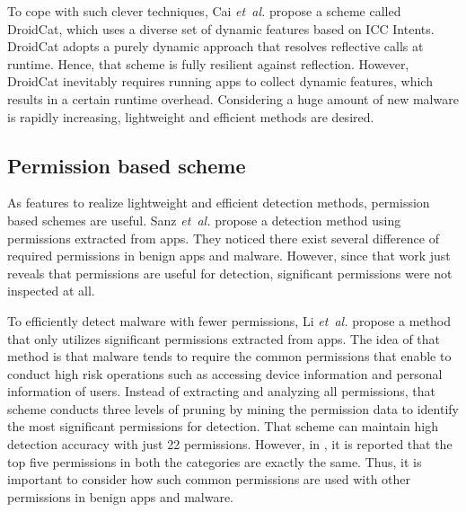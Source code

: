\documentclass{ieeeaccess}
\newcommand{\etal}{\textit{et~al.}}
\begin{document}
To cope with such clever techniques, Cai \etal \cite{cai2018droidcat} propose a scheme called DroidCat, which uses a diverse set of dynamic features based on ICC Intents.
DroidCat adopts a purely dynamic approach that resolves reflective calls at runtime.
Hence, that scheme is fully resilient against reflection.
However, DroidCat inevitably requires running apps to collect dynamic features, which results in a certain runtime overhead.  
Considering a huge amount of new malware is rapidly increasing, lightweight and efficient methods are desired.

\subsection{Permission based scheme}
As features to realize lightweight and efficient detection methods, permission based schemes are useful.
Sanz \etal \cite{sanz2013puma} propose a detection method using permissions extracted from apps.  
They noticed there exist several difference of required permissions in benign apps and malware.
However, since that work just reveals that permissions are useful for detection, significant permissions were not inspected at all.

To efficiently detect malware with fewer permissions, Li \etal \cite{li2018significant} propose a method that only utilizes significant permissions extracted from apps.
The idea of that method is that malware tends to require the common permissions that enable to conduct high risk operations such as accessing device information and personal information of users.
Instead of extracting and analyzing all permissions, that scheme conducts three levels of pruning by mining the permission data to identify the most significant permissions for detection.
That scheme can maintain high detection accuracy with just 22 permissions.
However, in \cite{sanz2013puma}, it is reported that the top five permissions in both the categories are exactly the same.
Thus, it is important to consider how such common permissions are used with other permissions in benign apps and malware.
\end{document}
